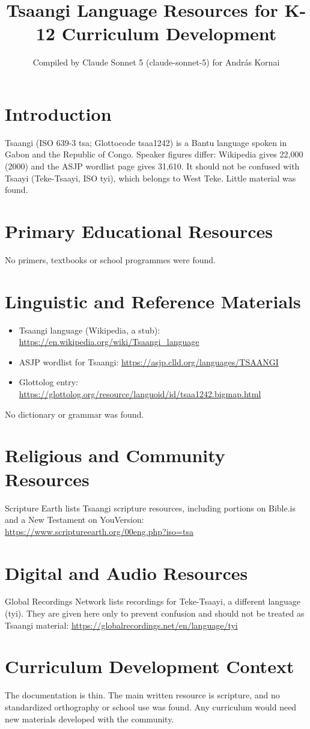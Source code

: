 \documentclass[12pt]{article}
\title{Tsaangi Language Resources for K-12 Curriculum Development}
\author{Compiled by Claude Sonnet 5 (claude-sonnet-5) for Andr\'as Kornai}
\date{}
\begin{document}
\maketitle

\section{Introduction}
Tsaangi (ISO 639-3 tsa; Glottocode tsaa1242) is a Bantu language spoken in Gabon and the Republic of Congo. Speaker figures differ: Wikipedia gives 22,000 (2000) and the ASJP wordlist page gives 31,610. It should not be confused with Tsaayi (Teke-Tsaayi, ISO tyi), which belongs to West Teke. Little material was found.

\section{Primary Educational Resources}
No primers, textbooks or school programmes were found.

\section{Linguistic and Reference Materials}
\begin{itemize}
\item Tsaangi language (Wikipedia, a stub): \url{https://en.wikipedia.org/wiki/Tsaangi_language}
\item ASJP wordlist for Tsaangi: \url{https://asjp.clld.org/languages/TSAANGI}
\item Glottolog entry: \url{https://glottolog.org/resource/languoid/id/tsaa1242.bigmap.html}
\end{itemize}
No dictionary or grammar was found.

\section{Religious and Community Resources}
Scripture Earth lists Tsaangi scripture resources, including portions on Bible.is and a New Testament on YouVersion:
\url{https://www.scriptureearth.org/00eng.php?iso=tsa}

\section{Digital and Audio Resources}
Global Recordings Network lists recordings for Teke-Tsaayi, a different language (tyi). They are given here only to prevent confusion and should not be treated as Tsaangi material:
\url{https://globalrecordings.net/en/language/tyi}

\section{Curriculum Development Context}
The documentation is thin. The main written resource is scripture, and no standardized orthography or school use was found. Any curriculum would need new materials developed with the community.
\end{document}
